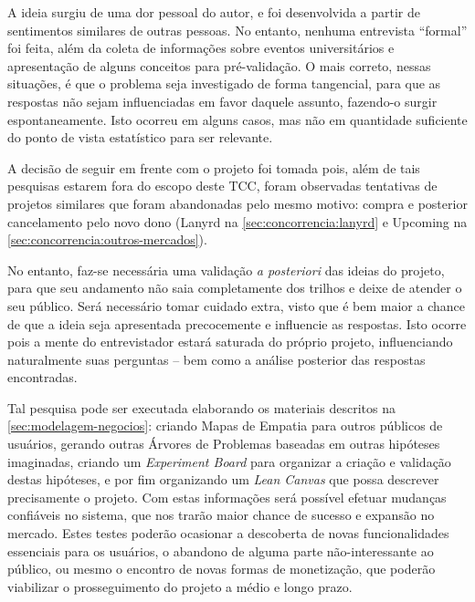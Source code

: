 \documentclass[12pt,a4paper,twoside,hyphens,english,brazil]{abntex2}
\begin{document}
A ideia surgiu de uma dor pessoal do autor, e foi desenvolvida a partir de sentimentos similares de outras pessoas. No entanto, nenhuma entrevista ``formal'' foi feita, além da coleta de informações sobre eventos universitários e apresentação de alguns conceitos para pré-validação. O mais correto, nessas situações, é que o problema seja investigado de forma tangencial, para que as respostas não sejam influenciadas em favor daquele assunto, fazendo-o surgir espontaneamente. Isto ocorreu em alguns casos, mas não em quantidade suficiente do ponto de vista estatístico para ser relevante.

A decisão de seguir em frente com o projeto foi tomada pois, além de tais pesquisas estarem fora do escopo deste TCC, foram observadas tentativas de projetos similares que foram abandonadas pelo mesmo motivo: compra e posterior cancelamento pelo novo dono (Lanyrd na \autoref{sec:concorrencia:lanyrd} e Upcoming na \autoref{sec:concorrencia:outros-mercados}).

No entanto, faz-se necessária uma validação \emph{a posteriori} das ideias do projeto, para que seu andamento não saia completamente dos trilhos e deixe de atender o seu público. Será necessário tomar cuidado extra, visto que é bem maior a chance de que a ideia seja apresentada precocemente e influencie as respostas. Isto ocorre pois a mente do entrevistador estará saturada do próprio projeto, influenciando naturalmente suas perguntas -- bem como a análise posterior das respostas encontradas.

Tal pesquisa pode ser executada elaborando os materiais descritos na \autoref{sec:modelagem-negocios}: criando Mapas de Empatia para outros públicos de usuários, gerando outras Árvores de Problemas baseadas em outras hipóteses imaginadas, criando um \emph{Experiment Board}\footnotemark\cite{experiment-board-post}\cite{experiment-board-javelin} para organizar a criação e validação destas hipóteses, e por fim organizando um \emph{Lean Canvas} que possa descrever precisamente o projeto. Com estas informações será possível efetuar mudanças confiáveis no sistema, que nos trarão maior chance de sucesso e expansão no mercado. Estes testes poderão ocasionar a descoberta de novas funcionalidades essenciais para os usuários, o abandono de alguma parte não-interessante ao público, ou mesmo o encontro de novas formas de monetização, que poderão viabilizar o prosseguimento do projeto a médio e longo prazo.
\end{document}
